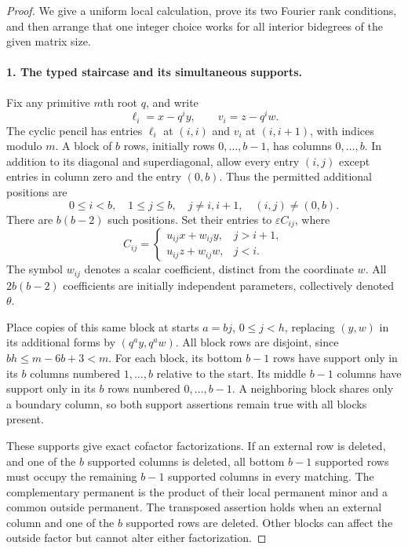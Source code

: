 \documentclass[11pt,a4paper]{article}
\theoremstyle{definition}\newtheorem{definition}{Definition}
\begin{document}
\begin{proof}
We give a uniform local calculation, prove its two Fourier rank
conditions, and then arrange that one integer choice works for all
interior bidegrees of the given matrix size.

\paragraph{1. The typed staircase and its simultaneous supports.}
Fix any primitive $m$th root $q$, and write
\[
 \ell_i=x-q^iy,\qquad v_i=z-q^iw.
\]
The cyclic pencil has entries $\ell_i$ at $(i,i)$ and $v_i$ at
$(i,i+1)$, with indices modulo $m$.
A block of $b$ rows, initially rows $0,\ldots,b-1$, has columns
$0,\ldots,b$. In addition to its diagonal and superdiagonal, allow
every entry $(i,j)$ except entries in column zero and the entry
$(0,b)$. Thus the permitted additional positions are
\[
 0\leq i<b,\quad1\leq j\leq b,\quad
 j\ne i,i+1,\quad(i,j)\ne(0,b).
\]
There are $b(b-2)$ such positions. Set their entries to
$\varepsilon C_{ij}$, where
\begin{equation}\label{R22:types}
 C_{ij}=\begin{cases}
 u_{ij}x+w_{ij}y,&j>i+1,\\
 u_{ij}z+w_{ij}w,&j<i.
 \end{cases}
\end{equation}
The symbol $w_{ij}$ denotes a scalar coefficient, distinct from the
coordinate $w$. All $2b(b-2)$ coefficients are initially independent
parameters, collectively denoted $\theta$.

Place copies of this same block at starts $a=bj$, $0\leq j<h$,
replacing $(y,w)$ in its additional forms by $(q^ay,q^aw)$.
All block rows are disjoint, since $bh\leq m-6b+3<m$.
For each block, its bottom $b-1$ rows have support only in its
$b$ columns numbered $1,\ldots,b$ relative to the start.
Its middle $b-1$ columns have support only in its $b$ rows numbered
$0,\ldots,b-1$. A neighboring block shares only a boundary column,
so both support assertions remain true with all blocks present.

These supports give exact cofactor factorizations. If an external row
is deleted, and one of the $b$ supported columns is deleted, all
bottom $b-1$ supported rows must occupy the remaining $b-1$ supported
columns in every matching. The complementary permanent is the product
of their local permanent minor and a common outside permanent.
The transposed assertion holds when an external column and one of
the $b$ supported rows are deleted. Other blocks can affect the outside
factor but cannot alter either factorization.


\end{proof}
\end{document}
